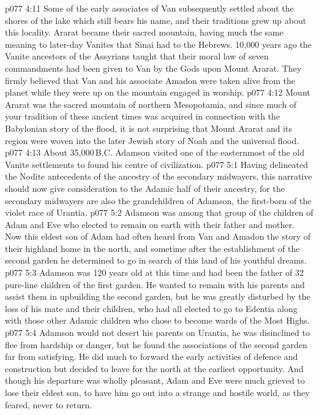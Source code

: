 \vs p077 4:11 \pc Some of the early associates of Van subsequently settled about the shores of the lake which still bears his name, and their traditions grew up about this locality. Ararat became their sacred mountain, having much the same meaning to later\hyp{}day Vanites that Sinai had to the Hebrews. 10,000 years ago the Vanite ancestors of the Assyrians taught that their moral law of seven commandments had been given to Van by the Gods upon Mount Ararat. They firmly believed that Van and his associate Amadon were taken alive from the planet while they were up on the mountain engaged in worship.
\vs p077 4:12 Mount Ararat was the sacred mountain of northern Mesopotamia, and since much of your tradition of these ancient times was acquired in connection with the Babylonian story of the flood, it is not surprising that Mount Ararat and its region were woven into the later Jewish story of Noah and the universal flood.
\vs p077 4:13 About 35,000\,B.C. Adamson visited one of the easternmost of the old Vanite settlements to found his centre of civilization.
\vs p077 5:1 Having delineated the Nodite antecedents of the ancestry of the secondary midwayers, this narrative should now give consideration to the Adamic half of their ancestry, for the secondary midwayers are also the grandchildren of Adamson, the first\hyp{}born of the violet race of Urantia.
\vs p077 5:2 \pc Adamson was among that group of the children of Adam and Eve who elected to remain on earth with their father and mother. Now this eldest son of Adam had often heard from Van and Amadon the story of their highland home in the north, and sometime after the establishment of the second garden he determined to go in search of this land of his youthful dreams.
\vs p077 5:3 Adamson was 120 years old at this time and had been the father of 32 pure\hyp{}line children of the first garden. He wanted to remain with his parents and assist them in upbuilding the second garden, but he was greatly disturbed by the loss of his mate and their children, who had all elected to go to Edentia along with those other Adamic children who chose to become wards of the Most Highs.
\vs p077 5:4 Adamson would not desert his parents on Urantia, he was disinclined to flee from hardship or danger, but he found the associations of the second garden far from satisfying. He did much to forward the early activities of defence and construction but decided to leave for the north at the earliest opportunity. And though his departure was wholly pleasant, Adam and Eve were much grieved to lose their eldest son, to have him go out into a strange and hostile world, as they feared, never to return.
